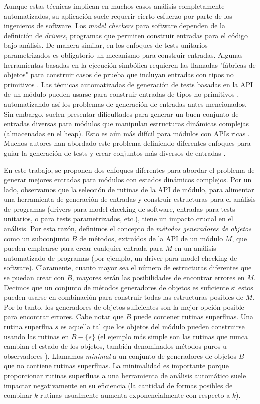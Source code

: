 Aunque estas técnicas implican en muchos casos análisis completamente automatizados, su aplicación suele requerir cierto esfuerzo por parte de los ingenieros de software. Los \emph{model checkers} para software dependen de la definición de \emph{drivers}, programas que permiten construir entradas para el código bajo análisis. De manera similar, en los enfoques de tests unitarios parametrizados \cite{Tillmann:2010} es obligatorio un mecanismo para construir entradas. Algunas herramientas basadas en la ejecución simbólica requieren las llamadas "fábricas de objetos" para construir casos de prueba que incluyan entradas con tipos no primitivos \cite{Tillmann:2008}. Las técnicas automatizadas de generación de tests basadas en la API de un módulo pueden usarse para construir entradas de tipos no primitivos \cite{Pacheco07, Fraser11}, automatizando así los problemas de generación de entradas antes mencionados. Sin embargo, suelen presentar dificultades para generar un buen conjunto de entradas diversas para módulos que manipulan estructuras dinámicas complejas (almacenadas en el heap). Esto es aún más difícil para módulos con APIs ricas \cite{Ponzio:2018}. Muchos autores han abordado este problema definiendo diferentes enfoques para guiar la generación de tests y crear conjuntos más diversos de entradas \cite{Ponzio:2018, Ciupa:2008}.

En este trabajo, se proponen dos enfoques diferentes para abordar el problema de generar mejores entradas para módulos con estados dinámicos complejos. Por un lado, observamos que la selección de rutinas de la API de módulo, para alimentar una herramienta de generación de entradas y construir estructuras para el análisis de programas (drivers para model checking de software, entradas para tests unitarios, o para tests parametrizados, etc.), tiene un impacto crucial en el análisis. Por esta razón, definimos el concepto de \emph{métodos generadores de objetos} como un subconjunto \(B\) de métodos, extraídos de la API de un módulo \(M\), que pueden emplearse para crear cualquier entrada para \(M\) en un análisis automatizado de programas  (por ejemplo, un driver para model checking de software). 
Claramente, cuanto mayor sea el número de estructuras diferentes que se puedan crear con \(B\), mayores serán las posibilidades de encontrar errores en \(M\). Decimos que un conjunto de métodos generadores de objetos es suficiente si estos pueden usarse en combinación para construir todas las estructuras posibles de \(M\). Por lo tanto, los generadores de objetos suficientes son la mejor opción posible para encontrar errores. Cabe notar que \(B\) puede contener rutinas superfluas. Una rutina superflua \(s\) es aquella tal que los objetos del módulo pueden construirse usando las rutinas en $B - \{s\}$ (el ejemplo más simple son las rutinas que nunca cambian el estado de los objetos, también denominados métodos puros u observadores \cite{Boyapati02}). Llamamos \emph{minimal} a un conjunto de generadores de objetos \(B\) que no contiene rutinas superfluas. La minimalidad es importante porque proporcionar rutinas superfluas a una herramienta de análisis automático suele impactar negativamente en su eficiencia (la cantidad de formas posibles de combinar \(k\) rutinas usualmente aumenta exponencialmente con respecto a \(k\)). 

